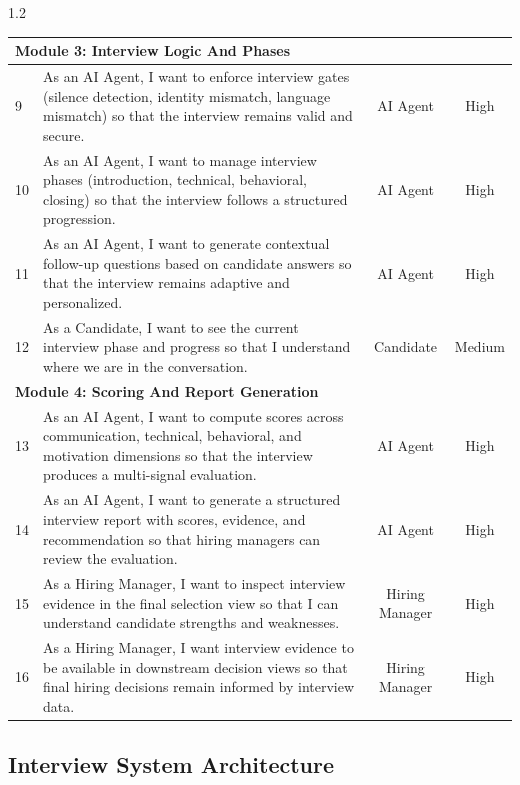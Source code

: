 \begin{spacing}{1.2}
\begin{center}
\begin{tabularx}{\textwidth}{|l|X|c|c|}
\multicolumn{4}{|l|}{\cellcolor{gray!10}\textbf{Module 3: Interview Logic And Phases}} \\ \hline
9 & As an AI Agent, I want to enforce interview gates (silence detection, identity mismatch, language mismatch) so that the interview remains valid and secure. & AI Agent & High \\ \hline
10 & As an AI Agent, I want to manage interview phases (introduction, technical, behavioral, closing) so that the interview follows a structured progression. & AI Agent & High \\ \hline
11 & As an AI Agent, I want to generate contextual follow-up questions based on candidate answers so that the interview remains adaptive and personalized. & AI Agent & High \\ \hline
12 & As a Candidate, I want to see the current interview phase and progress so that I understand where we are in the conversation. & Candidate & Medium \\ \hline

\multicolumn{4}{|l|}{\cellcolor{gray!10}\textbf{Module 4: Scoring And Report Generation}} \\ \hline
13 & As an AI Agent, I want to compute scores across communication, technical, behavioral, and motivation dimensions so that the interview produces a multi-signal evaluation. & AI Agent & High \\ \hline
14 & As an AI Agent, I want to generate a structured interview report with scores, evidence, and recommendation so that hiring managers can review the evaluation. & AI Agent & High \\ \hline
15 & As a Hiring Manager, I want to inspect interview evidence in the final selection view so that I can understand candidate strengths and weaknesses. & Hiring Manager & High \\ \hline
16 & As a Hiring Manager, I want interview evidence to be available in downstream decision views so that final hiring decisions remain informed by interview data. & Hiring Manager & High \\ \hline

\end{tabularx}
\end{center}
\end{spacing}

\subsection{Interview System Architecture}
\label{sec:sprint4:interview_architecture}

